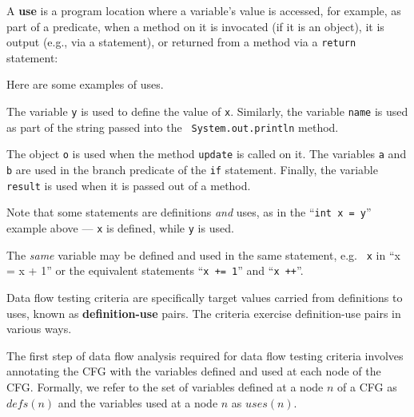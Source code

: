 
A {\bf use} is a program location where a variable's value is accessed, for
example, as part of a predicate, when a method on it is invocated (if it is an
object), it is output (e.g., via a  statement), or
returned from a method via a {\tt return} statement:

\begin{center} 
\end{center}  


Here are some examples of uses.

The variable {\tt y} is used to define the value of {\tt x}. Similarly, the variable
{\tt name} is used as part of the string passed into the {\tt
System.out.println} method. 

The object {\tt o} is used when the method {\tt update} is called on it. The
variables {\tt a} and {\tt b} are used in the branch predicate of the {\tt if}
statement. Finally, the variable {\tt result} is used when it is passed out of
a method.


Note that some statements are definitions {\it and} uses, as in the ``{\tt int x = y}''
example above --- {\tt x} is defined, while {\tt y} is used. 

The {\it same} variable may be defined and used in the same statement, e.g. {\tt
x} in ``{x = x + 1}'' or the equivalent statements ``{\tt x += 1}'' and ``{\tt x ++}''.


Data flow testing criteria are specifically target values carried from
definitions to uses, known as {\bf definition-use} pairs. The criteria exercise
definition-use pairs in various ways.


The first step of data flow analysis required for data flow testing criteria
involves annotating the CFG with the variables defined and used at each node of
the CFG. Formally, we refer to the set of variables defined at a node $n$ of a
CFG as $\mathit{defs}(n)$ and the variables used at a node $n$ as $\mathit{uses}(n)$.

